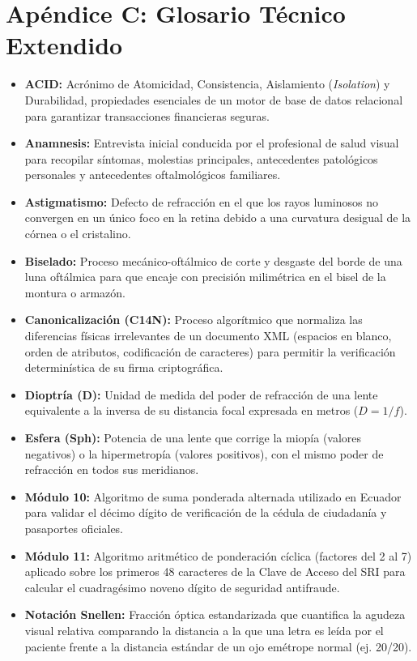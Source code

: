 \documentclass[12pt,a4paper]{report}
\begin{document}
\section*{Apéndice C: Glosario Técnico Extendido}
\begin{itemize}
    \item \textbf{ACID:} Acrónimo de Atomicidad, Consistencia, Aislamiento (\textit{Isolation}) y Durabilidad, propiedades esenciales de un motor de base de datos relacional para garantizar transacciones financieras seguras.
    \item \textbf{Anamnesis:} Entrevista inicial conducida por el profesional de salud visual para recopilar síntomas, molestias principales, antecedentes patológicos personales y antecedentes oftalmológicos familiares.
    \item \textbf{Astigmatismo:} Defecto de refracción en el que los rayos luminosos no convergen en un único foco en la retina debido a una curvatura desigual de la córnea o el cristalino.
    \item \textbf{Biselado:} Proceso mecánico-oftálmico de corte y desgaste del borde de una luna oftálmica para que encaje con precisión milimétrica en el bisel de la montura o armazón.
    \item \textbf{Canonicalización (C14N):} Proceso algorítmico que normaliza las diferencias físicas irrelevantes de un documento XML (espacios en blanco, orden de atributos, codificación de caracteres) para permitir la verificación determinística de su firma criptográfica.
    \item \textbf{Dioptría (D):} Unidad de medida del poder de refracción de una lente equivalente a la inversa de su distancia focal expresada en metros ($D = 1/f$).
    \item \textbf{Esfera (Sph):} Potencia de una lente que corrige la miopía (valores negativos) o la hipermetropía (valores positivos), con el mismo poder de refracción en todos sus meridianos.
    \item \textbf{Módulo 10:} Algoritmo de suma ponderada alternada utilizado en Ecuador para validar el décimo dígito de verificación de la cédula de ciudadanía y pasaportes oficiales.
    \item \textbf{Módulo 11:} Algoritmo aritmético de ponderación cíclica (factores del 2 al 7) aplicado sobre los primeros 48 caracteres de la Clave de Acceso del SRI para calcular el cuadragésimo noveno dígito de seguridad antifraude.
    \item \textbf{Notación Snellen:} Fracción óptica estandarizada que cuantifica la agudeza visual relativa comparando la distancia a la que una letra es leída por el paciente frente a la distancia estándar de un ojo emétrope normal (ej. 20/20).

\end{itemize}
\end{document}
